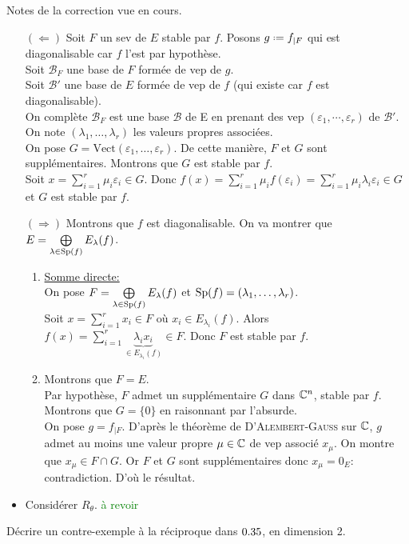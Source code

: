 Notes de la correction vue en cours.
\begin{preuve}
    \begin{itemize}
        \item[$(\Leftarrow)$] Soit $F$ un sev de $E$ stable par $f$.
        Posons $g \defeq f_{\vert F}$ qui est diagonalisable car $f$ l'est par hypothèse. \\
        Soit $\mathscr{B}_F$ une base de $F$ formée de vep de $g$. \\
        Soit $\mathscr{B}'$ une base de $E$ formée de vep de $f$ (qui existe car $f$ est diagonalisable). \\
        On complète $\mathscr{B}_F$ est une base $\mathscr{B}$ de E en prenant des vep $(\varepsilon_1, \cdots, \varepsilon_r)$ de $\mathscr{B}'$. On note $(\lambda_1, \dots, \lambda_r)$ les valeurs propres associées. \\
        On pose $G = \mathrm{Vect}(\varepsilon_1, \dots, \varepsilon_r)$. De cette manière, $F$ et $G$ sont supplémentaires. Montrons que $G$ est stable par $f$. \\
        Soit $x = \sum\limits_{i=1}^{r} \mu_i \varepsilon_i \in G$. Donc $f(x) = \sum\limits_{i=1}^{r} \mu_i f(\varepsilon_i) =  \sum\limits_{i=1}^{r} \mu_i \lambda_i \varepsilon_i \in G$ et $G$ est stable par $f$.
    
        \item[$(\Rightarrow)$] Montrons que $f$ est diagonalisable. On va montrer que $E = \bigoplus\limits_{\lambda \in \mathrm{Sp}(f)} E_\lambda (f)$.
        
        \begin{enumerate}
            \item \underline{Somme directe:} \\
            On pose $F = \bigoplus\limits_{\lambda \in \mathrm{Sp}(f)} E_\lambda (f)$ et $\mathrm{Sp}(f) = (\lambda_1, \dots, \lambda_r)$. \\
            Soit $x = \sum\limits_{i=1}^{r} x_i \in F$ où $x_i \in E_{\lambda_i}(f)$. Alors $f(x) = \sum\limits_{i=1}^{r} \underbrace{\lambda_i x_i}_{\in E_{\lambda_i}(f)} \in F$. Donc $F$ est stable par $f$.
            \item Montrons que $F = E$. \\
            Par hypothèse, $F$ admet un supplémentaire $G$ dans $\mathbb{C}^n$, stable par $f$. Montrons que $G = \{0\}$ en raisonnant par l'absurde. \\
            On pose $g = f_{\vert F}$. D'après le théorème de \textsc{D'Alembert-Gauss} sur $\mathbb{C}$, $g$ admet au moins une valeur propre $\mu \in \mathbb{C}$ de vep associé $x_\mu$. On montre que $x_\mu \in F \cap G$. Or $F$ et $G$ sont supplémentaires donc $x_\mu = 0_E$: contradiction. D'où le résultat. 
        \end{enumerate}
        \item Considérer $R_\theta$. \textcolor{green}{à revoir}
    \end{itemize}
\end{preuve}

\begin{exercice}
    Décrire un contre-exemple à la réciproque dans $0.35$, en dimension 2.
\end{exercice}  